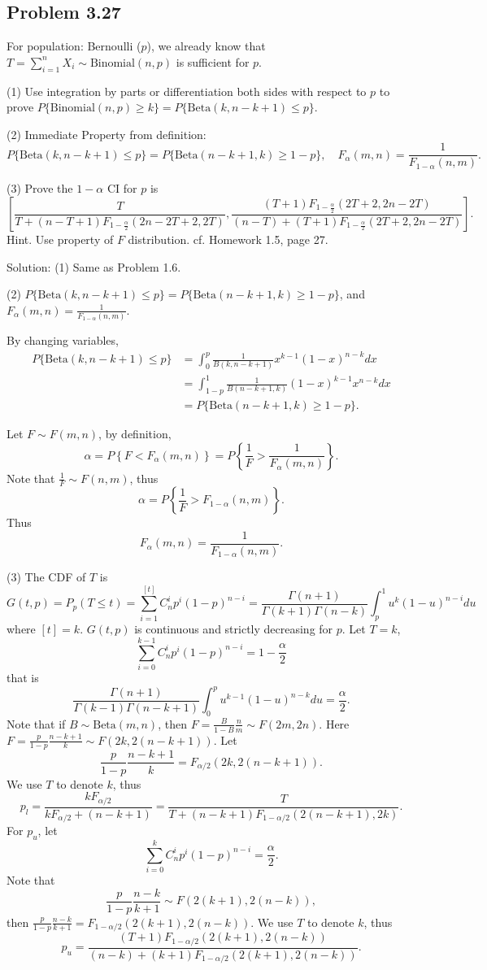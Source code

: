 \subsection*{Problem 3.27}
For population: Bernoulli ($p$), we already know that $T=\sum_{i=1}^{n}X_{i}\sim\text{Binomial}(n,p)$ is sufficient for $p$.

(1) Use integration by parts or differentiation both sides with respect to $p$ to prove $P\{\text{Binomial}(n,p)\geq k\}=P\{\text{Beta}(k,n-k+1)\leq p\}$.

(2) Immediate Property from definition:
\[
P\{\text{Beta}(k,n-k+1)\leq p\}=P\{\text{Beta}(n-k+1,k)\geq 1-p\},\quad F_{\alpha}(m,n)=\frac{1}{F_{1-\alpha}(n,m)}.
\]

(3) Prove the $1-\alpha$ CI for $p$ is
\[
\left[\frac{T}{T+(n-T+1)F_{1-\frac{\alpha}{2}}(2n-2T+2,2T)},\frac{(T+1)F_{1-\frac{\alpha}{2}}(2T+2,2n-2T)}{(n-T)+(T+1)F_{1-\frac{\alpha}{2}}(2T+2,2n-2T)}\right].
\]
Hint. Use property of $F$ distribution. cf. Homework 1.5, page 27.

{Solution:}
(1) Same as Problem 1.6.

(2) $P\{\text{Beta}(k,n-k+1)\leq p\}=P\{\text{Beta}(n-k+1,k)\geq 1-p\}$, and $F_{\alpha}(m,n)=\frac{1}{F_{1-\alpha}(n,m)}$.

By changing variables,
\begin{align*}
    P\{\text{Beta}(k,n-k+1)\leq p\}
    &=\int_{0}^{p}\frac{1}{B(k,n-k+1)}x^{k-1}(1-x)^{n-k}dx\\
    &=\int_{1-p}^{1}\frac{1}{B(n-k+1,k)}(1-x)^{k-1}x^{n-k}dx\\
    &=P\{\text{Beta}(n-k+1,k)\geq 1-p\}.
\end{align*}

Let $F\sim F(m,n)$, by definition,
\[
\alpha=P\left\{F<F_{\alpha}(m,n)\right\}=P\left\{\frac{1}{F}>\frac{1}{F_{\alpha}(m,n)}\right\}.
\]
Note that $\frac{1}{F}\sim F(n,m)$, thus
\[
\alpha=P\left\{\frac{1}{F}>F_{1-\alpha}(n,m)\right\}.
\]
Thus
\[
F_{\alpha}(m,n)=\frac{1}{F_{1-\alpha}(n,m)}.
\]

(3) The CDF of $T$ is
\[
G(t,p)=P_{p}(T\leq t)=\sum_{i=1}^{[t]}C_{n}^{i}p^{i}(1-p)^{n-i}=\frac{\Gamma(n+1)}{\Gamma(k+1)\Gamma(n-k)}\int_{p}^{1}u^{k}(1-u)^{n-i}du
\]
where $[t]=k$. $G(t,p)$ is continuous and strictly decreasing for $p$. Let $T=k$,
\[
\sum_{i=0}^{k-1}C_{n}^{i}p^{i}(1-p)^{n-i}=1-\frac{\alpha}{2}
\]
that is
\[
\frac{\Gamma(n+1)}{\Gamma(k-1)\Gamma(n-k+1)}\int_{0}^{p}u^{k-1}(1-u)^{n-k}du=\frac{\alpha}{2}.
\]
Note that if $B\sim\text{Beta}(m,n)$, then $F=\frac{B}{1-B}\frac{n}{m}\sim F(2m,2n)$. Here $F=\frac{p}{1-p}\frac{n-k+1}{k}\sim F(2k,2(n-k+1))$. Let
\[
\frac{p}{1-p}\frac{n-k+1}{k}=F_{\alpha/2}(2k,2(n-k+1)).
\]
We use $T$ to denote $k$, thus
\[
p_{l}=\frac{kF_{\alpha/2}}{kF_{\alpha/2}+(n-k+1)}=\frac{T}{T+(n-k+1)F_{1-\alpha/2}(2(n-k+1),2k)}.
\]
For $p_{u}$, let
\[
\sum_{i=0}^{k}C^{i}_{n}p^{i}(1-p)^{n-i}=\frac{\alpha}{2}.
\]
Note that
\[
\frac{p}{1-p}\frac{n-k}{k+1}\sim F(2(k+1),2(n-k)),
\]
then $\frac{p}{1-p}\frac{n-k}{k+1}=F_{1-\alpha/2}(2(k+1),2(n-k))$. We use $T$ to denote $k$, thus
\[
p_{u}=\frac{(T+1)F_{1-\alpha/2}(2(k+1),2(n-k))}{(n-k)+(k+1)F_{1-\alpha/2}(2(k+1),2(n-k))}.
\]

